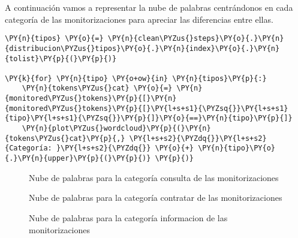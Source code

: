 A continuación vamos a representar la nube de palabras centrándonos en cada categoría de las monitorizaciones para apreciar las diferencias entre ellas. 

\vspace{0.5cm}

    \begin{tcolorbox}[breakable, size=fbox, boxrule=1pt, pad at break*=1mm,colback=cellbackground, colframe=cellborder]
\begin{Verbatim}[commandchars=\\\{\}]
\PY{n}{tipos} \PY{o}{=} \PY{n}{clean\PYZus{}steps}\PY{o}{.}\PY{n}{distribucion\PYZus{}tipos}\PY{o}{.}\PY{n}{index}\PY{o}{.}\PY{n}{tolist}\PY{p}{(}\PY{p}{)}

\PY{k}{for} \PY{n}{tipo} \PY{o+ow}{in} \PY{n}{tipos}\PY{p}{:}
    \PY{n}{tokens\PYZus{}cat} \PY{o}{=} \PY{n}{monitored\PYZus{}tokens}\PY{p}{[}\PY{n}{monitored\PYZus{}tokens}\PY{p}{[}\PY{l+s+s1}{\PYZsq{}}\PY{l+s+s1}{tipo}\PY{l+s+s1}{\PYZsq{}}\PY{p}{]}\PY{o}{==}\PY{n}{tipo}\PY{p}{]}
    \PY{n}{plot\PYZus{}wordcloud}\PY{p}{(}\PY{n}{tokens\PYZus{}cat}\PY{p}{,} \PY{l+s+s2}{\PYZdq{}}\PY{l+s+s2}{Categoría: }\PY{l+s+s2}{\PYZdq{}} \PY{o}{+} \PY{n}{tipo}\PY{o}{.}\PY{n}{upper}\PY{p}{(}\PY{p}{)} \PY{p}{)}
\end{Verbatim}
\end{tcolorbox}


    
    \begin{figure}[!ht]
    	\centering
    	
    	
        \caption{Nube de palabras para la categoría consulta de las monitorizaciones}
        \label{fig:cloudmoni_consulta}
    \end{figure}    
    
    
    \begin{figure}[!ht]
        	\centering
        	
        	
            \caption{Nube de palabras para la categoría contratar de las monitorizaciones}
            \label{fig:cloudmoni_contratar}
        \end{figure}    
   
   
       \begin{figure}[!ht]
           	\centering
           	
           	
               \caption{Nube de palabras para la categoría informacion de las monitorizaciones}
               \label{fig:cloudmoni_info}
           \end{figure}  
              
